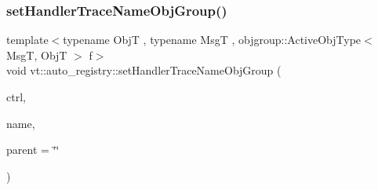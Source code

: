 \subsubsection{\texorpdfstring{set\+Handler\+Trace\+Name\+Obj\+Group()}{setHandlerTraceNameObjGroup()}}
{\footnotesize\ttfamily template$<$typename ObjT , typename MsgT , objgroup\+::\+Active\+Obj\+Type$<$ Msg\+T, Obj\+T $>$ f$>$ \\
void vt\+::auto\+\_\+registry\+::set\+Handler\+Trace\+Name\+Obj\+Group (\begin{DoxyParamCaption}\item[{\hyperlink{namespacevt_adbbef13b92f0a93b14c219b7cc8a48f2}{Handler\+Control\+Type}}]{ctrl,  }\item[{std\+::string const \&}]{name,  }\item[{std\+::string const \&}]{parent = {\ttfamily \char`\"{}\char`\"{}} }\end{DoxyParamCaption})}

